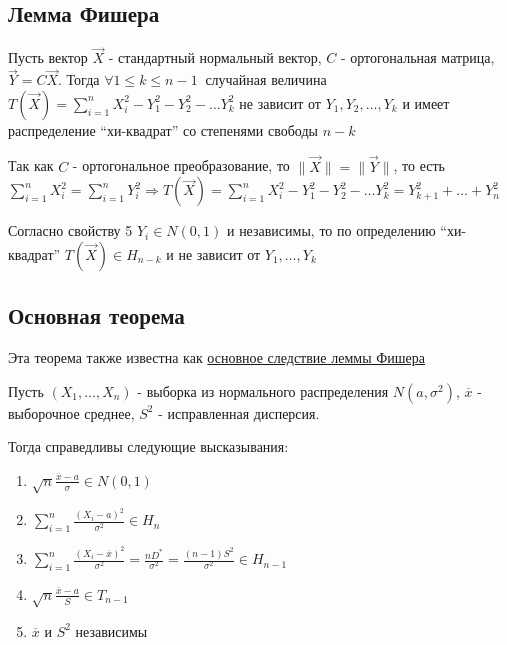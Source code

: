 \documentclass[12pt]{article}
\begin{document}
\subsection{Лемма Фишера}

\hypertarget{fishers_lemma}{}

\begin{MyTheorem}
    Пусть вектор $\vec X$ - стандартный нормальный вектор, $C$ - ортогональная матрица, $\vec Y = C \vec X$.
    Тогда $\forall 1 \leq k \leq n - 1 \ $ случайная величина $T(\vec X) = \sum_{i = 1}^n X_i^2 - Y_1^2 - Y_2^2 - \dots Y_k^2$ 
    не зависит от $Y_1, Y_2, \dots, Y_k$ и имеет распределение \enquote{хи-квадрат} со степенями свободы $n - k$
\end{MyTheorem}

\begin{MyProof}
    Так как $C$ - ортогональное преобразование, то $\|\vec X\| = \|\vec Y\|$, то есть $\sum_{i = 1}^n X^2_i = \sum_{i = 1}^n Y^2_i \Longrightarrow
    T(\vec X) = \sum_{i = 1}^n X_i^2 - Y_1^2 - Y_2^2 - \dots Y_k^2 = Y^2_{k + 1} + \dots + Y^2_{n}$

    Согласно свойству 5 $Y_i \in N(0, 1)$ и независимы, то по определению \enquote{хи-квадрат} $T(\vec X) \in H_{n - k}$ и не зависит от $Y_1, \dots, Y_k$
\end{MyProof}

\subsection{Основная теорема}

Эта теорема также известна как \href{https://tvims.nsu.ru/chernova/ms/lec/node37.html}{основное следствие леммы Фишера}

\begin{MyTheorem}
    \Ths Пусть $(X_1, \dots, X_n)$ - выборка из нормального распределения $N(a, \sigma^2)$, $\overline{x}$ - выборочное среднее, $S^2$ - исправленная дисперсия.

    Тогда справедливы следующие высказывания:

    \begin{enumerate}
        \item $\sqrt{n} \frac{\overline{x} - a}{\sigma} \in N(0, 1)$
        
        \item $\sum_{i = 1}^n \frac{(X_i - a)^2}{\sigma^2} \in H_n$
        
        \item $\sum_{i = 1}^n \frac{(X_i - \overline{x})^2}{\sigma^2} = \frac{n D^*}{\sigma^2} = \frac{(n - 1) S^2}{\sigma^2} \in H_{n - 1}$

        \item $\sqrt{n} \frac{\overline{x} - a}{S} \in T_{n - 1}$
        
        \item $\overline{x}$ и $S^2$ независимы
    \end{enumerate}
\end{MyTheorem}
\end{document}
